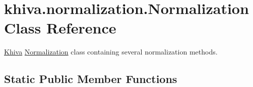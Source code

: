 \hypertarget{classkhiva_1_1normalization_1_1_normalization}{}\section{khiva.\+normalization.\+Normalization Class Reference}
\label{classkhiva_1_1normalization_1_1_normalization}


\mbox{\hyperlink{classkhiva_1_1_khiva}{Khiva}} \mbox{\hyperlink{classkhiva_1_1normalization_1_1_normalization}{Normalization}} class containing several normalization methods.  


\subsection*{Static Public Member Functions}
